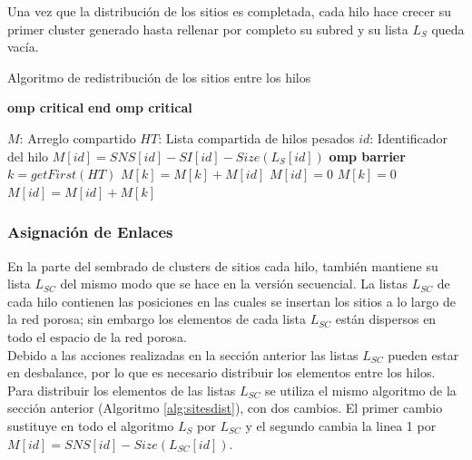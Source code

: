 Una vez que la distribución de los sitios es completada, cada hilo hace crecer su primer cluster generado hasta rellenar por 
completo su subred y su lista $L_S$ queda vacía.
 
\begin{algorithm}
\caption{Algoritmo de redistribución de los sitios entre los hilos}\label{alg:sitesdist}
\begin{algorithmic}[1]
    {\textbf{omp critical}}
    {\textbf{end omp critical}}
    
\Require $M$: Arreglo compartido
\Require $HT$: Lista compartida de hilos pesados
\Require $id$: Identificador del hilo
\State $M[id]=SNS[id]-SI[id]-Size(L_S[id])$
	\ompcritical
		\State {}
	\eompcritical
\EndIf
\State \textbf{omp barrier}
	\ompcritical
			\State $k=getFirst(HT)$
				\State {}
				\State $M[k]=M[k]+M[id]$
				\State $M[id]=0$
			\Else
				\State {}
				\State $M[k]=0$
				\State $M[id]=M[id]+M[k]$
				\State {}	
			\EndIf
		\EndWhile
	\eompcritical
\EndIf
\end{algorithmic}
\end{algorithm}

\subsubsection{Asignación de Enlaces}
\label{subsec:pbond}
En la parte del sembrado de clusters de sitios cada hilo, también mantiene su lista $L_{SC}$ del mismo modo que se hace en la versión secuencial. La listas $L_{SC}$ de cada hilo contienen las posiciones en las cuales se insertan los sitios a lo largo de la red porosa; sin embargo los elementos de cada lista $L_{SC}$ están dispersos en todo el espacio de la red porosa.\\

Debido a las acciones realizadas en la sección anterior las listas $L_{SC}$ pueden estar en desbalance, por lo que es necesario 
distribuir los elementos entre los hilos. Para distribuir los elementos de las listas $L_{SC}$ se utiliza el mismo algoritmo de 
la sección anterior (Algoritmo \ref{alg:sitesdist}), con dos cambios. El primer cambio sustituye en todo el algoritmo $L_S$ por 
$L_{SC}$ y el segundo cambia la linea 1 por $M[id]=SNS[id]-Size(L_{SC}[id])$.\\


